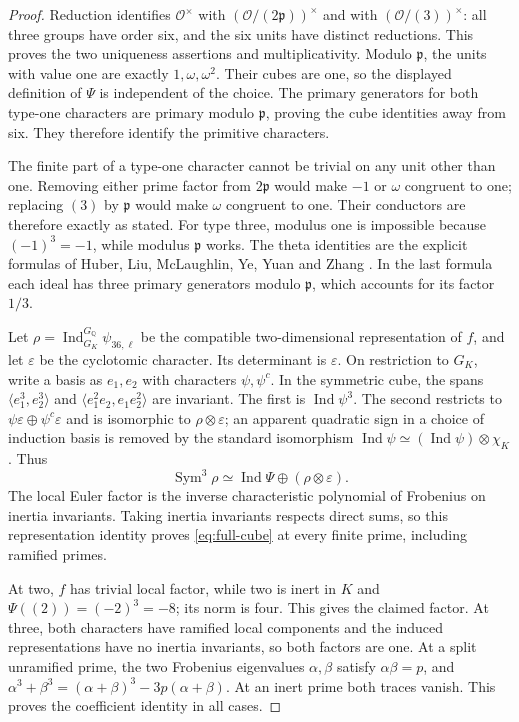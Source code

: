 \begin{proof}
Reduction identifies $\mathcal O^\times$ with
$(\mathcal O/(2\mathfrak p))^\times$ and with
$(\mathcal O/(3))^\times$: all three groups have order six, and the
six units have distinct reductions. This proves the two uniqueness
assertions and multiplicativity. Modulo $\mathfrak p$, the units with
value one are exactly $1,\omega,\omega^2$. Their cubes are one,
so the displayed definition of $\Psi$ is independent of the
choice. The primary generators for both type-one characters are
primary modulo $\mathfrak p$, proving the cube identities away from
six. They therefore identify the primitive characters.

The finite part of a type-one character cannot be trivial on any unit
other than one. Removing either prime factor from $2\mathfrak p$
would make $-1$ or $\omega$ congruent to one; replacing $(3)$ by
$\mathfrak p$ would make $\omega$ congruent to one. Their conductors
are therefore exactly as stated. For type three, modulus one is
impossible because $(-1)^3=-1$, while modulus $\mathfrak p$ works.
The theta identities are the explicit formulas of
Huber, Liu, McLaughlin, Ye, Yuan and Zhang
\cite[Lemma~2.1, equations~(2.2), (2.4), and~(2.10)]{HuberCM}.
In the last formula
each ideal has three primary generators modulo $\mathfrak p$, which
accounts for its factor $1/3$.

Let $\rho=\operatorname{Ind}_{G_K}^{G_{\mathbb Q}}\psi_{36,\ell}$
be the compatible two-dimensional representation of $f$, and let
$\varepsilon$ be the cyclotomic character. Its determinant is
$\varepsilon$. On restriction to $G_K$, write a basis as $e_1,e_2$
with characters $\psi,\psi^c$. In the symmetric cube, the spans
$\langle e_1^3,e_2^3\rangle$ and
$\langle e_1^2e_2,e_1e_2^2\rangle$ are invariant. The first is
$\operatorname{Ind}\psi^3$. The second restricts to
$\psi\varepsilon\oplus\psi^c\varepsilon$ and is isomorphic to
$\rho\otimes\varepsilon$; an apparent quadratic sign in a choice of
induction basis is removed by the standard isomorphism
$\operatorname{Ind}\psi\simeq
 (\operatorname{Ind}\psi)\otimes\chi_K$.
Thus
\[
 \operatorname{Sym}^3\rho\simeq
 \operatorname{Ind}\Psi\oplus(\rho\otimes\varepsilon).
\]
The local Euler factor is the inverse characteristic polynomial of
Frobenius on inertia invariants. Taking inertia invariants respects
direct sums, so this representation identity proves
\eqref{eq:full-cube} at every finite prime, including ramified primes.

At two, $f$ has trivial local factor, while two is inert in $K$ and
$\Psi((2))=(-2)^3=-8$; its norm is four. This gives the claimed
factor. At three, both characters have ramified local components
and the induced representations have no inertia invariants, so both
factors are one. At a split unramified prime, the two Frobenius
eigenvalues $\alpha,\beta$ satisfy $\alpha\beta=p$, and
$\alpha^3+\beta^3=(\alpha+\beta)^3-3p(\alpha+\beta)$.
At an inert prime both traces vanish. This proves the coefficient
identity in all cases.
\end{proof}


